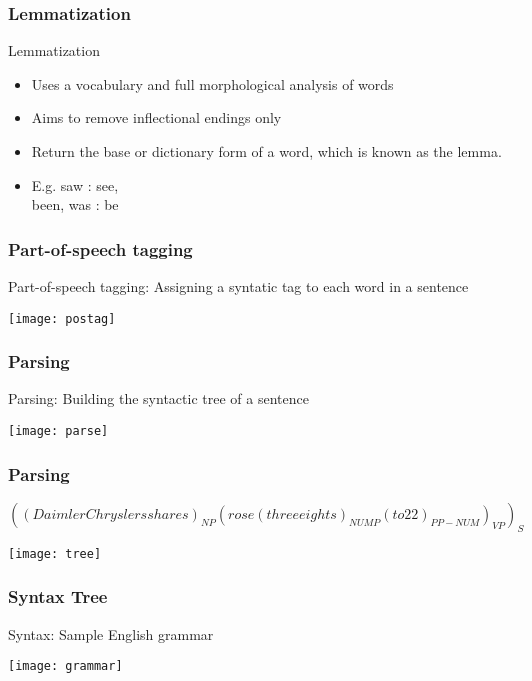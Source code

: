 \begin{frame}[fragile]\frametitle{Lemmatization}
Lemmatization
		\begin{itemize}
		\item  Uses a vocabulary and full morphological analysis of words
    \item Aims to remove inflectional endings only 
    \item Return the base or dictionary form of a word, which is known as the lemma.
    \item E.g. saw :  see,      \\              been, was : be
		\end{itemize}
\end{frame}

\begin{frame}[fragile]\frametitle{Part-of-speech tagging}
Part-of-speech tagging: Assigning a syntatic tag to each word in a sentence
\begin{center}
\texttt{[image: postag]}
\end{center}
\end{frame}

\begin{frame}[fragile]\frametitle{Parsing}
Parsing: Building the syntactic tree of a sentence
\begin{center}
\texttt{[image: parse]}
\end{center}
\end{frame}

\begin{frame}[fragile]\frametitle{Parsing}
$ ((DaimlerChryslers shares)_{NP} (rose (three eights)_{ NUMP} (to 22)_{PP-NUM}  )_{VP}  )_{S}$
\begin{center}
\texttt{[image: tree]}
\end{center}
\end{frame}


\begin{frame}[fragile]\frametitle{Syntax Tree}
Syntax: Sample English grammar
\begin{center}
\texttt{[image: grammar]}
\end{center}
\end{frame}

